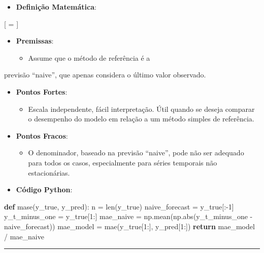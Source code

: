 \documentclass[11pt]{article}
\providecommand{\tightlist}{%
      \setlength{\itemsep}{0pt}\setlength{\parskip}{0pt}}
\newenvironment{Shaded}{}{}
\newcommand{\KeywordTok}[1]{\textcolor[rgb]{0.00,0.44,0.13}{\textbf{{#1}}}}
\newcommand{\DecValTok}[1]{\textcolor[rgb]{0.25,0.63,0.44}{{#1}}}
\newcommand{\NormalTok}[1]{{#1}}
\newcommand{\ControlFlowTok}[1]{\textcolor[rgb]{0.00,0.44,0.13}{\textbf{{#1}}}}
\newcommand{\OperatorTok}[1]{\textcolor[rgb]{0.40,0.40,0.40}{{#1}}}
\newcommand{\BuiltInTok}[1]{{#1}}
\begin{document}
\begin{itemize}
\tightlist
\item
  \textbf{Definição Matemática}:
\end{itemize}

{[}  =
 {]}

\begin{itemize}
\tightlist
\item
  \textbf{Premissas}:

  \begin{itemize}
  \tightlist
  \item
    Assume que o método de referência é a
  \end{itemize}
\end{itemize}

previsão ``naive'', que apenas considera o último valor observado.

\begin{itemize}
\tightlist
\item
  \textbf{Pontos Fortes}:

  \begin{itemize}
  \tightlist
  \item
    Escala independente, fácil interpretação. Útil quando se deseja
    comparar o desempenho do modelo em relação a um método simples de
    referência.
  \end{itemize}
\item
  \textbf{Pontos Fracos}:

  \begin{itemize}
  \tightlist
  \item
    O denominador, baseado na previsão ``naive'', pode não ser adequado
    para todos os casos, especialmente para séries temporais não
    estacionárias.
  \end{itemize}
\item
  \textbf{Código Python}:
\end{itemize}

\begin{Shaded}
\begin{Highlighting}[]
\KeywordTok{def}\NormalTok{ mase(y\_true, y\_pred):}
\NormalTok{    n }\OperatorTok{=} \BuiltInTok{len}\NormalTok{(y\_true)}
\NormalTok{    naive\_forecast }\OperatorTok{=}\NormalTok{ y\_true[:}\OperatorTok{{-}}\DecValTok{1}\NormalTok{]}
\NormalTok{    y\_t\_minus\_one }\OperatorTok{=}\NormalTok{ y\_true[}\DecValTok{1}\NormalTok{:]}
\NormalTok{    mae\_naive }\OperatorTok{=}\NormalTok{ np.mean(np.}\BuiltInTok{abs}\NormalTok{(y\_t\_minus\_one }\OperatorTok{{-}}\NormalTok{ naive\_forecast))}
\NormalTok{    mae\_model }\OperatorTok{=}\NormalTok{ mae(y\_true[}\DecValTok{1}\NormalTok{:], y\_pred[}\DecValTok{1}\NormalTok{:])}
    \ControlFlowTok{return}\NormalTok{ mae\_model }\OperatorTok{/}\NormalTok{ mae\_naive}
\end{Highlighting}
\end{Shaded}

\begin{center}\rule{0.5\linewidth}{0.5pt}\end{center}


    
    
    
\end{document}
